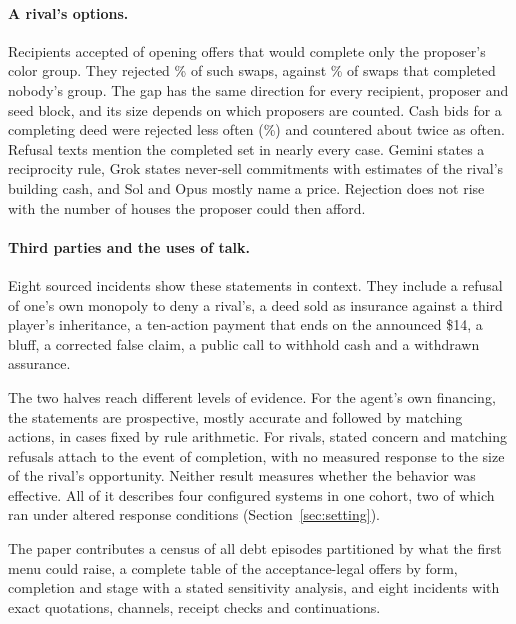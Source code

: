 \paragraph{A rival's options.}
Recipients accepted  of  opening offers that would complete only the proposer's color group. They rejected \% of such swaps, against \% of swaps that completed nobody's group. The gap has the same direction for every recipient, proposer and seed block, and its size depends on which proposers are counted. Cash bids for a completing deed were rejected less often (\%) and countered about twice as often. Refusal texts mention the completed set in nearly every case. Gemini states a reciprocity rule, Grok states never-sell commitments with estimates of the rival's building cash, and Sol and Opus mostly name a price. Rejection does not rise with the number of houses the proposer could then afford.

\paragraph{Third parties and the uses of talk.}
Eight sourced incidents show these statements in context. They include a refusal of one's own monopoly to deny a rival's, a deed sold as insurance against a third player's inheritance, a ten-action payment that ends on the announced \$14, a bluff, a corrected false claim, a public call to withhold cash and a withdrawn assurance.

The two halves reach different levels of evidence. For the agent's own financing, the statements are prospective, mostly accurate and followed by matching actions, in cases fixed by rule arithmetic. For rivals, stated concern and matching refusals attach to the event of completion, with no measured response to the size of the rival's opportunity. Neither result measures whether the behavior was effective. All of it describes four configured systems in one cohort, two of which ran under altered response conditions (Section~\ref{sec:setting}).

The paper contributes a census of all  debt episodes partitioned by what the first menu could raise, a complete table of the  acceptance-legal offers by form, completion and stage with a stated sensitivity analysis, and eight incidents with exact quotations, channels, receipt checks and continuations.
